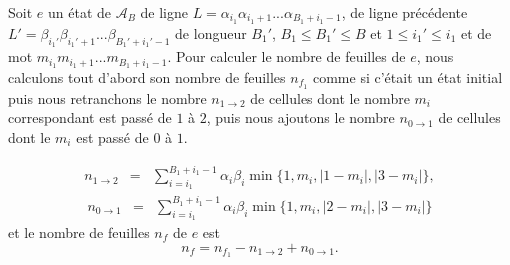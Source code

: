   Soit $e$ un état de $\mathcal{A}_{B}$ de ligne $L=\alpha_{i_{1}}\alpha_{i_{1}+1}...\alpha_{B_{1}+i_{1}-1}$, de ligne précédente $L'=\beta_{i_{1}'}\beta_{i_{1}'+1}...\beta_{B_{1}'+i_{1}'-1}$ de longueur $B_{1}'$, $B_{1}\leq B_{1}'\leq B$ et  $1\leq i_{1}'\leq i_{1}$ et de mot $m_{i_{1}}m_{i_{1}+1}...m_{B_{1}+i_{1}-1}$.
  Pour calculer le nombre de feuilles de $e$,  nous calculons tout d'abord   son nombre de feuilles $n_{f_{1}}$ comme si c'était un état  initial puis nous retranchons le nombre $n_{1\rightarrow 2}$ de cellules dont le nombre $m_{i}$ correspondant est passé de $1$ à $2$, puis nous ajoutons le nombre $n_{0\rightarrow 1}$ de cellules dont le $m_{i}$ est passé de $0$ à $1$.
 \begin{Prop}\label{propdec131}
 \begin{eqnarray}\label{fordec131}
 n_{1\rightarrow 2} & = & \sum_{i=i_{1}}^{B_{1}+i_{1}-1}\alpha_{i}\beta_{i}\min\{1,m_{i},\vert 1-m_{i}\vert, \vert 3-m_{i}\vert\},
 \end{eqnarray}
 \begin{eqnarray}\label{fordec132}
 n_{0 \rightarrow 1} & = & \sum_{i=i_{1}}^{B_{1}+i_{1}-1}\alpha_{i}\beta_{i}\min\{1,m_{i},\vert 2-m_{i}\vert, \vert 3-m_{i}\vert\}
 \end{eqnarray}
 et le nombre de feuilles $n_{f}$ de $e$ est 
 $$n_{f}=n_{f_{1}} -n_{1\rightarrow 2} + n_{0\rightarrow 1}.$$
 \end{Prop}
